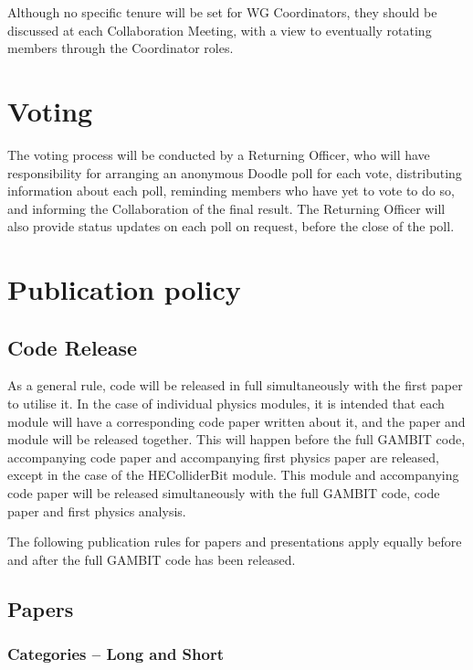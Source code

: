 Although no specific tenure will be set for WG Coordinators, they should be discussed at each Collaboration Meeting, with a view to eventually rotating members through the Coordinator roles.

\section{Voting}

The voting process will be conducted by a Returning Officer, who will have responsibility for arranging an anonymous Doodle poll for each vote, distributing information about each poll, reminding members who have yet to vote to do so, and informing the Collaboration of the final result.  The Returning Officer will also provide status updates on each poll on request, before the close of the poll.

\section{Publication policy}

\subsection{Code Release}

As a general rule, code will be released in full simultaneously with the first paper to utilise it.  In the case of individual physics modules, it is intended that each module will have a corresponding code paper written about it, and the paper and module will be released together.  This will happen before the full GAMBIT code, accompanying code paper and accompanying first physics paper are released, except in the case of the HEColliderBit module.  This module and accompanying code paper will be released simultaneously with the full GAMBIT code, code paper and first physics analysis.

The following publication rules for papers and presentations apply equally before and after the full GAMBIT code has been released.

\subsection{Papers}

\subsubsection{Categories -- Long and Short}

